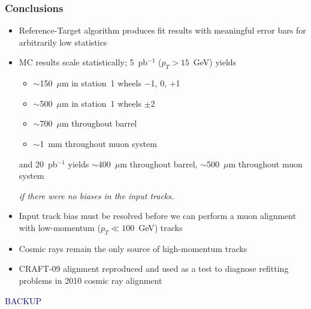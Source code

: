 \documentclass[compress]{beamer}
\begin{document}

\begin{frame}
\frametitle{Conclusions}

\begin{itemize}
\item Reference-Target algorithm produces fit results with meaningful
  error bars for arbitrarily low statistics
\item MC results scale statistically; 5~pb$^{-1}$ ($p_T > 15$~GeV) yields
\begin{itemize}
\item $\sim$150~$\mu$m in station~1 wheels $-$1, 0, $+$1
\item $\sim$500~$\mu$m in station~1 wheels $\pm$2
\item $\sim$700~$\mu$m throughout barrel
\item $\sim$1~mm throughout muon system
\end{itemize}
and 20~pb$^{-1}$ yields $\sim$400~$\mu$m throughout barrel,
$\sim$500~$\mu$m throughout muon system

\vspace{0.1 cm}
{\it if there were no biases in the input tracks.}

\item Input track bias must be resolved before we can perform a muon
  alignment with low-momentum ($p_T \ll 100$~GeV) tracks

\item Cosmic rays remain the only source of high-momentum tracks

\item CRAFT-09 alignment reproduced and used as a test to diagnose
  refitting problems in 2010 cosmic ray alignment
\end{itemize}

\label{numpages}
\end{frame}

\begin{frame}
\begin{center}
\LARGE \textcolor{darkblue}{BACKUP}
\end{center}
\end{frame}
\end{document}
